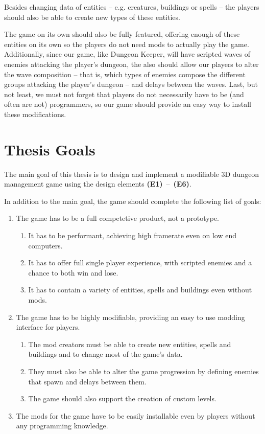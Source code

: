 Besides changing data of entities -- e.g. creatures, buildings or spells -- the players should also be able to create new types of these
entities.

The game on its own should also be fully featured, offering enough of these entities
on its own so the players do not need mods to actually play the game. Additionally, since our game, like Dungeon Keeper,
will have scripted waves of enemies attacking the player's dungeon, the also should allow our players to alter the wave 
composition -- that is, which types of enemies compose the different groups attacking the player's dungeon --  and delays between
the waves. Last, but not least, we must not forget that players do not necessarily have to be (and often are not)
programmers, so our game should provide an easy way to install these modifications.

\section{Thesis Goals}

The main goal of this thesis is to design and implement a modifiable 3D dungeon management game using the design elements \textbf{(E1)}~--~\textbf{(E6)}.

In addition to the main goal, the game should complete the following list of goals:

\begin{enumerate}[label=\textbf{(G\arabic*)}]
    \item The game has to be a full competetive product, not a prototype.
        \begin{enumerate}[label=\textbf{(G1.\arabic*)}]
            \item It has to be performant, achieving high framerate even on low end computers.
            \item It has to offer full single player experience, with scripted enemies and a chance to both win and lose.
            \item It has to contain a variety of entities, spells and buildings even without mods.
        \end{enumerate}
    \item The game has to be highly modifiable, providing an easy to use modding interface for players.
        \begin{enumerate}[label=\textbf{(G2.\arabic*)}]
            \item The mod creators must be able to create new entities, spells and buildings and to change most of the game's data.
            \item They must also be able to alter the game progression by defining enemies that spawn and delays between them.
            \item The game should also support the creation of custom levels.
        \end{enumerate}
    \item The mods for the game have to be easily installable even by players without any programming knowledge. 
\end{enumerate}
